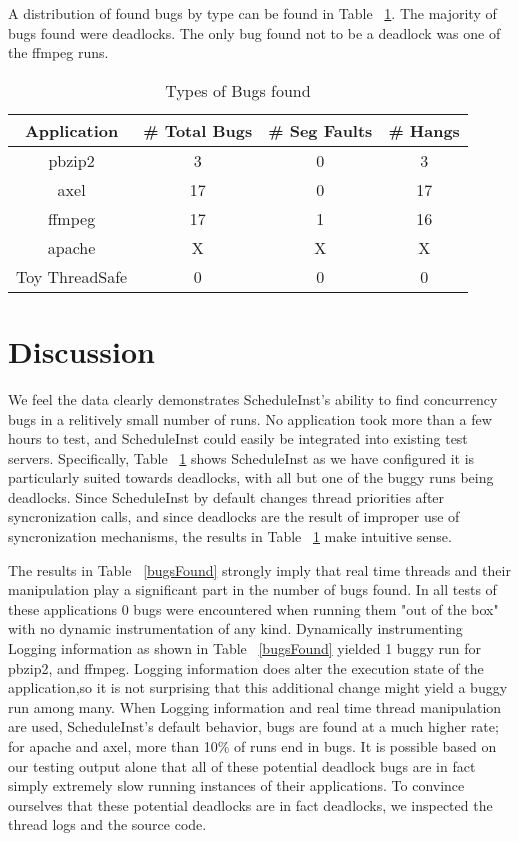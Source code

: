 \documentclass[10pt,]{article} %
\begin{document}
A distribution of found bugs by type can be found in Table ~\ref{typeBugs}.  The majority of bugs found were deadlocks.  The only bug found not to be a deadlock was one of the ffmpeg runs.
\begin{table}
\centering
\begin{tabular}{ |c|c|c|c| }
\hline
Application & \# Total Bugs & \# Seg Faults & \# Hangs \\ \hline \hline
pbzip2 & 3 & 0 & 3  \\ \hline
axel   & 17 & 0 & 17 \\ \hline
ffmpeg & 17 & 1 & 16 \\ \hline
apache & X & X & X \\ \hline
Toy ThreadSafe & 0 & 0 & 0 \\ \hline
\end{tabular}
\caption{Types of Bugs found}
\label{typeBugs}
\end{table}





\section{Discussion}


We feel the data clearly demonstrates ScheduleInst's ability to find concurrency bugs in a relitively small number of runs.  No application took more than a few hours to test, and ScheduleInst could easily be integrated into existing test servers. Specifically, Table ~\ref{typeBugs} shows ScheduleInst as we have configured it is particularly suited towards deadlocks, with all but one of the buggy runs being deadlocks. Since ScheduleInst by default changes thread priorities after syncronization calls, and since deadlocks are the result of improper use of syncronization mechanisms, the results in Table ~\ref{typeBugs} make intuitive sense. 

The results in Table ~\ref{bugsFound} strongly imply that real time threads and their manipulation play a significant part in the number of bugs found.  In all tests of these applications 0 bugs were encountered when running them "out of the box" with no dynamic instrumentation of any kind.  Dynamically instrumenting Logging information as shown in Table ~\ref{bugsFound} yielded 1 buggy run for pbzip2, and ffmpeg.  Logging information does alter the execution state of the application,so it is not surprising that this additional change might yield a buggy run among many.  When Logging information and real time thread manipulation are used, ScheduleInst's default behavior, bugs are found at a much higher rate; for apache and axel, more than 10\% of runs end in bugs.  
It is possible based on our testing output alone that all of these potential deadlock bugs are in fact simply extremely slow running instances of their applications. To convince ourselves that these potential deadlocks are in fact deadlocks, we inspected the thread logs and the source code.
\end{document}

